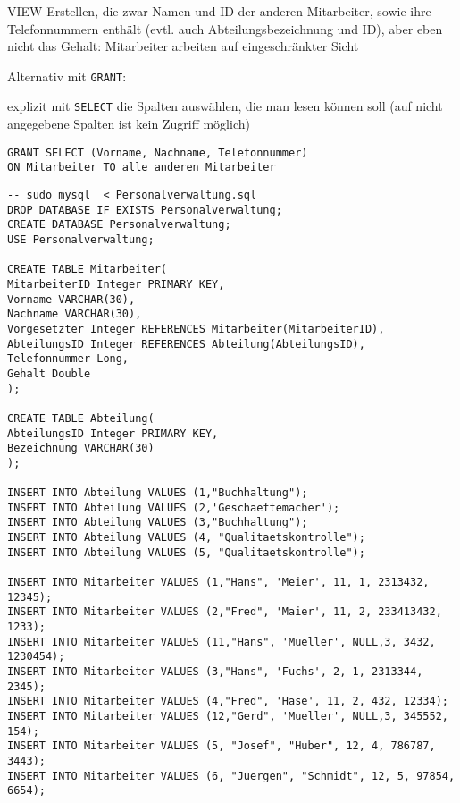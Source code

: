 \documentclass{lehramt-informatik-aufgabe}
\begin{document}
\begin{enumerate}
\begin{antwort}
VIEW Erstellen, die zwar Namen und ID der anderen Mitarbeiter, sowie
ihre Telefonnummern enthält (evtl. auch Abteilungsbezeichnung und ID),
aber eben nicht das Gehalt: Mitarbeiter arbeiten auf eingeschränkter
Sicht

Alternativ mit \verb|GRANT|:

explizit mit \verb|SELECT| die Spalten auswählen,
die man lesen können soll (auf nicht angegebene Spalten ist kein Zugriff
möglich)

\begin{verbatim}
GRANT SELECT (Vorname, Nachname, Telefonnummer)
ON Mitarbeiter TO alle anderen Mitarbeiter
\end{verbatim}
\end{antwort}
\end{enumerate}

\begin{verbatim}
-- sudo mysql  < Personalverwaltung.sql
DROP DATABASE IF EXISTS Personalverwaltung;
CREATE DATABASE Personalverwaltung;
USE Personalverwaltung;

CREATE TABLE Mitarbeiter(
MitarbeiterID Integer PRIMARY KEY,
Vorname VARCHAR(30),
Nachname VARCHAR(30),
Vorgesetzter Integer REFERENCES Mitarbeiter(MitarbeiterID),
AbteilungsID Integer REFERENCES Abteilung(AbteilungsID),
Telefonnummer Long,
Gehalt Double
);

CREATE TABLE Abteilung(
AbteilungsID Integer PRIMARY KEY,
Bezeichnung VARCHAR(30)
);

INSERT INTO Abteilung VALUES (1,"Buchhaltung");
INSERT INTO Abteilung VALUES (2,'Geschaeftemacher');
INSERT INTO Abteilung VALUES (3,"Buchhaltung");
INSERT INTO Abteilung VALUES (4, "Qualitaetskontrolle");
INSERT INTO Abteilung VALUES (5, "Qualitaetskontrolle");

INSERT INTO Mitarbeiter VALUES (1,"Hans", 'Meier', 11, 1, 2313432, 12345);
INSERT INTO Mitarbeiter VALUES (2,"Fred", 'Maier', 11, 2, 233413432, 1233);
INSERT INTO Mitarbeiter VALUES (11,"Hans", 'Mueller', NULL,3, 3432, 1230454);
INSERT INTO Mitarbeiter VALUES (3,"Hans", 'Fuchs', 2, 1, 2313344, 2345);
INSERT INTO Mitarbeiter VALUES (4,"Fred", 'Hase', 11, 2, 432, 12334);
INSERT INTO Mitarbeiter VALUES (12,"Gerd", 'Mueller', NULL,3, 345552, 154);
INSERT INTO Mitarbeiter VALUES (5, "Josef", "Huber", 12, 4, 786787, 3443);
INSERT INTO Mitarbeiter VALUES (6, "Juergen", "Schmidt", 12, 5, 97854, 6654);
\end{verbatim}
\end{document}
